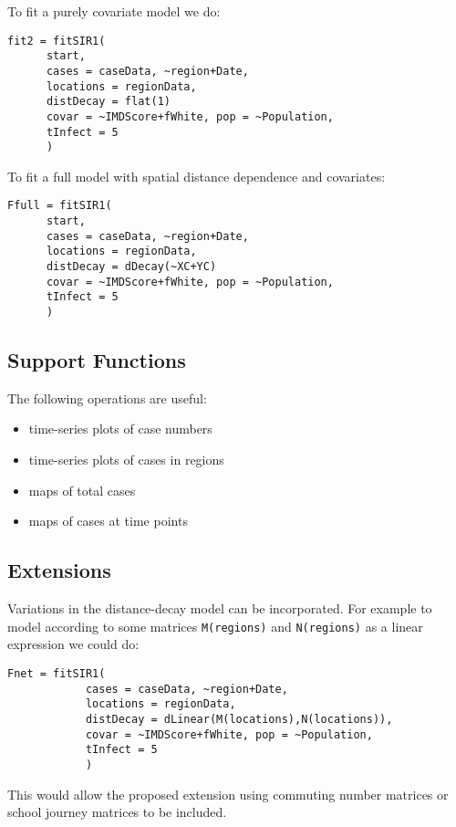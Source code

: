 \documentclass{article}
\begin{document}
To fit a purely covariate model we do:

\begin{verbatim}
fit2 = fitSIR1(
      start,
      cases = caseData, ~region+Date,
      locations = regionData, 
      distDecay = flat(1)
      covar = ~IMDScore+fWhite, pop = ~Population,
      tInfect = 5
      )
\end{verbatim}

To fit a full model with spatial distance dependence and covariates:

\begin{verbatim}
Ffull = fitSIR1(
      start,
      cases = caseData, ~region+Date,
      locations = regionData, 
      distDecay = dDecay(~XC+YC)
      covar = ~IMDScore+fWhite, pop = ~Population,
      tInfect = 5
      )
\end{verbatim}

\subsection*{Support Functions}

The following operations are useful:
\begin{itemize}
\item time-series plots of case numbers
\item time-series plots of cases in regions
\item maps of total cases
\item maps of cases at time points
\end{itemize}

\subsection*{Extensions}

Variations in the distance-decay model can be incorporated. For example to model
according to some matrices \verb|M(regions)| and \verb|N(regions)| as a linear expression we could do:

\begin{verbatim}
Fnet = fitSIR1(
            cases = caseData, ~region+Date,
            locations = regionData, 
            distDecay = dLinear(M(locations),N(locations)),
            covar = ~IMDScore+fWhite, pop = ~Population,
            tInfect = 5
            )
\end{verbatim}

This would allow the proposed extension using commuting number matrices or school journey
matrices to be included.
\end{document}
